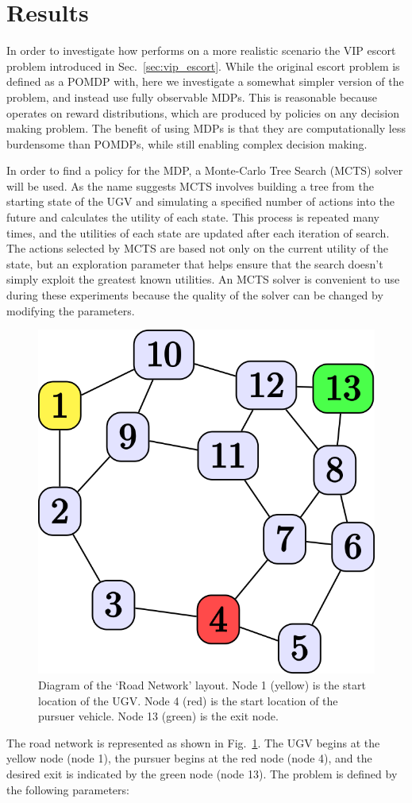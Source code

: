 \section{Results} \label{sec:results}
In order to investigate how \xQ{} performs on a more realistic scenario the VIP escort problem introduced in Sec.~\ref{sec:vip_escort}. While the original escort problem is defined as a POMDP with, here we investigate a somewhat simpler version of the problem, and instead use fully observable MDPs. This is reasonable because \xQ{} operates on reward distributions, which are produced by policies on any decision making problem. The benefit of using MDPs is that they are computationally less burdensome than POMDPs, while still enabling complex decision making.

In order to find a policy for the MDP, a Monte-Carlo Tree Search (MCTS) solver will be used. As the name suggests MCTS involves building a tree from the starting state of the UGV and simulating a specified number of actions into the future and calculates the utility of each state. This process is repeated many times, and the utilities of each state are updated after each iteration of search. The actions selected by MCTS are based not only on the current utility of the state, but an exploration parameter that helps ensure that the search doesn't simply exploit the greatest known utilities. An MCTS solver is convenient to use during these experiments because the quality of the solver can be changed by modifying the parameters.

\begin{figure}[tbp]
    \centering
    \includegraphics[width=0.4\linewidth]{Figures/original_roadnet.png}
    \caption{Diagram of the `Road Network' layout. Node 1 (yellow) is the start location of the UGV. Node 4 (red) is the start location of the pursuer vehicle. Node 13 (green) is the exit node.}
    \label{fig:roadnet}
\end{figure}

The road network is represented as shown in Fig.~\ref{fig:roadnet}. The UGV begins at the yellow node (node 1), the pursuer begins at the red node (node 4), and the desired exit is indicated by the green node (node 13). The problem is defined by the following parameters:

